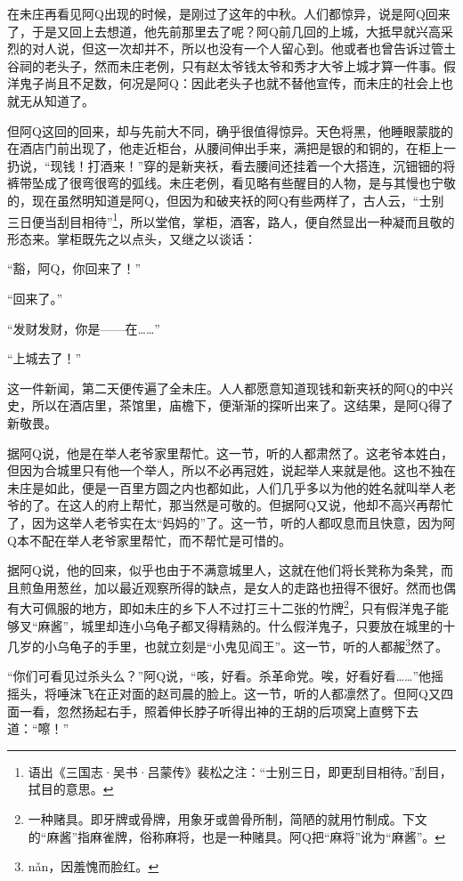 \documentclass[12pt,UTF8]{ctexbook}
\begin{document}
在未庄再看见阿Q出现的时候，是刚过了这年的中秋。人们都惊异，说是阿Q回来了，于是又回上去想道，他先前那里去了呢？阿Q前几回的上城，大抵早就兴高采烈的对人说，但这一次却并不，所以也没有一个人留心到。他或者也曾告诉过管土谷祠的老头子，然而未庄老例，只有赵太爷钱太爷和秀才大爷上城才算一件事。假洋鬼子尚且不足数，何况是阿Q：因此老头子也就不替他宣传，而未庄的社会上也就无从知道了。

但阿Q这回的回来，却与先前大不同，确乎很值得惊异。天色将黑，他睡眼蒙胧的在酒店门前出现了，他走近柜台，从腰间伸出手来，满把是银的和铜的，在柜上一扔说，“现钱！打酒来！”穿的是新夹袄，看去腰间还挂着一个大搭连，沉钿钿的将裤带坠成了很弯很弯的弧线。未庄老例，看见略有些醒目的人物，是与其慢也宁敬的，现在虽然明知道是阿Q，但因为和破夹袄的阿Q有些两样了，古人云，“士别三日便当刮目相待”\footnote{语出《三国志·吴书·吕蒙传》裴松之注：“士别三日，即更刮目相待。”刮目，拭目的意思。}，所以堂倌，掌柜，酒客，路人，便自然显出一种凝而且敬的形态来。掌柜既先之以点头，又继之以谈话：

“豁，阿Q，你回来了！”

“回来了。”

“发财发财，你是——在……”

“上城去了！”

这一件新闻，第二天便传遍了全未庄。人人都愿意知道现钱和新夹袄的阿Q的中兴史，所以在酒店里，茶馆里，庙檐下，便渐渐的探听出来了。这结果，是阿Q得了新敬畏。

据阿Q说，他是在举人老爷家里帮忙。这一节，听的人都肃然了。这老爷本姓白，但因为合城里只有他一个举人，所以不必再冠姓，说起举人来就是他。这也不独在未庄是如此，便是一百里方圆之内也都如此，人们几乎多以为他的姓名就叫举人老爷的了。在这人的府上帮忙，那当然是可敬的。但据阿Q又说，他却不高兴再帮忙了，因为这举人老爷实在太“妈妈的”了。这一节，听的人都叹息而且快意，因为阿Q本不配在举人老爷家里帮忙，而不帮忙是可惜的。

据阿Q说，他的回来，似乎也由于不满意城里人，这就在他们将长凳称为条凳，而且煎鱼用葱丝，加以最近观察所得的缺点，是女人的走路也扭得不很好。然而也偶有大可佩服的地方，即如未庄的乡下人不过打三十二张的竹牌\footnote{一种赌具。即牙牌或骨牌，用象牙或兽骨所制，简陋的就用竹制成。下文的“麻酱”指麻雀牌，俗称麻将，也是一种赌具。阿Q把“麻将”讹为“麻酱”。}，只有假洋鬼子能够叉“麻酱”，城里却连小乌龟子都叉得精熟的。什么假洋鬼子，只要放在城里的十几岁的小乌龟子的手里，也就立刻是“小鬼见阎王”。这一节，听的人都赧\footnote{n\v{a}n，因羞愧而脸红。}然了。

“你们可看见过杀头么？”阿Q说，“咳，好看。杀革命党。唉，好看好看……”他摇摇头，将唾沫飞在正对面的赵司晨的脸上。这一节，听的人都凛然了。但阿Q又四面一看，忽然扬起右手，照着伸长脖子听得出神的王胡的后项窝上直劈下去道：“嚓！”
\end{document}
